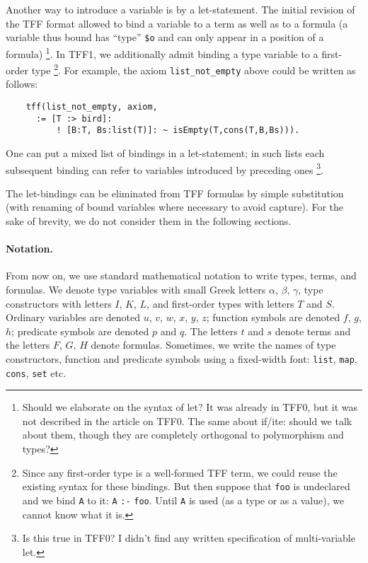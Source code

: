 Another way to introduce a variable is by a let-statement.
The initial revision of the TFF format allowed to bind a variable
to a term as well as to a formula (a variable thus bound has
``type'' \verb+$o+ and can only appear in a position of a formula)%
\footnote{Should we elaborate on the syntax of let?
It was already in TFF0, but it was not described in
the article on TFF0. The same about if/ite: should
we talk about them, though they are completely
orthogonal to polymorphism and types?}.
In TFF1, we additionally admit binding a type variable
to a first-order type%
\footnote{Since any first-order type is a well-formed TFF term,
we could reuse the existing syntax for these bindings.
But then suppose that {\tt foo} is undeclared and
we bind {\tt A} to it: {\tt A} {\tt :-} {\tt foo}.
Until {\tt A} is used
(as a type or as a value), we cannot know what it is.}.
For example,
the axiom \verb+list_not_empty+ above could be written as
follows:
\begin{verbatim}
    tff(list_not_empty, axiom,
      := [T :> bird]:
          ! [B:T, Bs:list(T)]: ~ isEmpty(T,cons(T,B,Bs))).
\end{verbatim}
One can put a mixed list of bindings in a let-statement;
in such lists each subsequent binding can refer
to variables introduced by preceding ones%
\footnote{Is this true in TFF0? I didn't find any written
specification of multi-variable let.}.

The let-bindings can be eliminated from TFF formulas by simple
substitution (with renaming of bound variables where necessary
to avoid capture). For the sake of brevity, we do not consider
them in the following sections.

\paragraph{Notation.} From now on, we use standard
mathematical notation to write types, terms, and formulas.
We denote type variables with small Greek letters
$\alpha$, $\beta$, $\gamma$, type constructors
with letters $I$, $K$, $L$, and first-order
types with letters $T$ and $S$. Ordinary variables
are denoted $u$, $v$, $w$, $x$, $y$, $z$; function
symbols are denoted $f$, $g$, $h$; predicate symbols
are denoted $p$ and $q$. The letters $t$ and $s$ denote
terms and the letters $F$, $G$, $H$ denote formulas.
Sometimes, we write the names of type constructors,
function and predicate symbols using a fixed-width
font: {\tt list}, {\tt map}, {\tt cons}, {\tt set}
etc.


